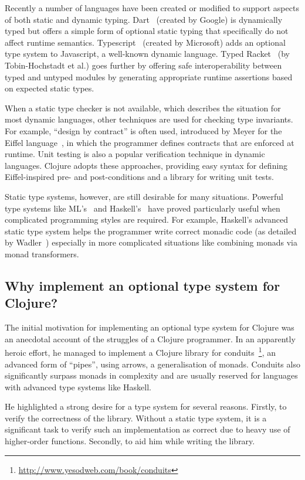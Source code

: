 Recently a number of languages have been created or modified to support aspects
of both static and dynamic typing.
Dart~\cite{Dart2012} (created by Google) is dynamically typed but offers a simple form of optional
static typing that specifically do not affect runtime semantics.
Typescript~\cite{TypeS2012} (created by Microsoft) adds an optional type system to Javascript,
a well-known dynamic language.
Typed Racket~\cite{TF08,Tob10} (by Tobin-Hochstadt et al.) goes further by offering safe interoperability
between typed and untyped modules by generating appropriate runtime assertions based
on expected static types.

When a static type checker is not available, which describes the situation
for most dynamic languages, other techniques are used for checking
type invariants. For example, ``design by contract'' is often used,
introduced by Meyer for the Eiffel language~\cite{Mey92},
in which the programmer defines contracts that are enforced at runtime.
Unit testing is also a popular verification technique in dynamic languages.
Clojure adopts these approaches, providing easy syntax for defining 
Eiffel-inspired pre- and post-conditions and a library for writing unit tests.

Static type systems, however, are still desirable for many situations.
Powerful type systems like ML's~\cite{Mil97} and Haskell's~\cite{Mar10} have proved particularly useful
when complicated programming styles are required. For example,
Haskell's advanced static type system helps the programmer write correct monadic code
(as detailed by Wadler~\cite{Wad95})
especially in more complicated situations like combining monads via monad transformers.

\subsection{Why implement an optional type system for Clojure?}

The initial motivation for implementing an optional type system
for Clojure was an anecdotal account of the struggles
of a Clojure programmer. In an apparently heroic effort, he managed to 
implement a Clojure library for conduits~\footnote{\url{http://www.yesodweb.com/book/conduits}}, 
an advanced form of ``pipes'', using arrows, a generalisation of monads.
Conduits also significantly surpass monads in complexity and are usually reserved
for languages with advanced type systems like Haskell.

He highlighted a strong desire for a type system for several reasons.
Firstly, to verify the correctness of the library.
Without a static type system, it is a significant task
to verify such an implementation as correct due to heavy use
of higher-order functions.
Secondly, to aid him while writing the library.

